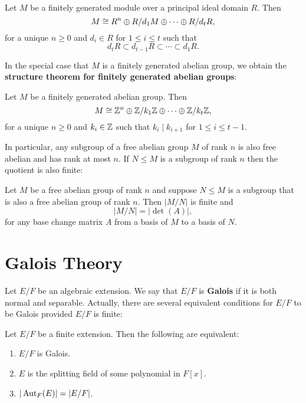     \begin{theorem*}
      \phantom{} \\
      Let $M$ be a finitely generated module over a principal ideal domain $R$. Then
      \[
        M \cong R^{n} \oplus R/d_{1}M \oplus \cdots \oplus R/d_{t}R,
      \]
      for a unique $n \ge 0$ and $d_{i} \in R$ for $1 \le i \le t$ such that
      \[
        d_{t}R \subset d_{t-1}R \subset \cdots \subset d_{1}R. 
      \]
    \end{theorem*}

    In the special case that $M$ is a finitely generated abelian group, we obtain the \textbf{structure theorem for finitely generated abelian groups}:

    \begin{theorem*}
      Let $M$ be a finitely generated abelian group. Then
      \[
        M \cong \mathbb{Z}^{n} \oplus \mathbb{Z}/k_{1}\mathbb{Z} \oplus \cdots \oplus \mathbb{Z}/k_{t}\mathbb{Z},
      \]
      for a unique $n \ge 0$ and $k_{i} \in \mathbb{Z}$ such that $k_{i} \mid k_{i+1}$ for $1 \le i \le t-1$.
    \end{theorem*}

    In particular, any subgroup of a free abelian group $M$ of rank $n$ is also free abelian and has rank at most $n$. If $N \le M$ is a subgroup of rank $n$ then the quotient is also finite:

    \begin{proposition}\label{prop:base_change_quotient_determinant}
      Let $M$ be a free abelian group of rank $n$ and suppose $N \le M$ is a subgroup that is also a free abelian group of rank $n$. Then $|M/N|$ is finite and
      \[
        |M/N| = |\det(A)|,
      \]
      for any base change matrix $A$ from a basis of $M$ to a basis of $N$.
    \end{proposition}
  \section{Galois Theory}\label{append:Galois Theory}
    Let $E/F$ be an algebraic extension. We say that $E/F$ is \textbf{Galois} if it is both normal and separable. Actually, there are several equivalent conditions for $E/F$ to be Galois provided $E/F$ is finite:

    \begin{proposition}
      Let $E/F$ be a finite extension. Then the following are equivalent:
      \begin{enumerate}[label=(\roman*)]
        \item $E/F$ is Galois.
        \item $E$ is the splitting field of some polynomial in $F[x]$.
        \item $|\operatorname{\mathrm{Aut}}_{F}(E)| = |E/F|$.
      \end{enumerate}
    \end{proposition}

